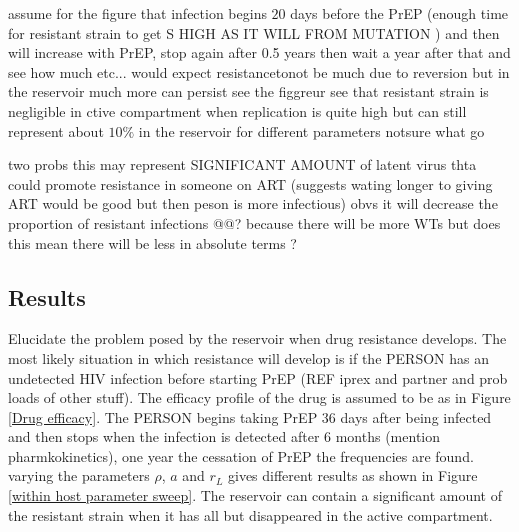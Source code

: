 \documentclass[DIV=15]{scrartcl}
\begin{document}
assume for the figure that infection begins 
$20$ days before the PrEP (enough time for resistant strain to get S HIGH AS IT WILL  FROM MUTATION 	)  and then will  increase with PrEP, stop again  after 0.5  years then wait a year after that and see how much etc...      would expect resistancetonot be much due to  reversion but in the reservoir much more can persist see the figgreur
see that resistant strain is negligible in ctive compartment when replication  is quite high but can still  represent about $10\%$ in the reservoir for different parameters notsure  what go 

two  probs this may represent  SIGNIFICANT AMOUNT 	of latent virus thta could promote resistance in someone on ART (suggests wating longer to giving ART would be good but then peson is  more  infectious) obvs it will  decrease the proportion of resistant infections @@? because there will be more  WTs  but does  this mean there will be less in absolute terms ?



















\subsection{Results}
Elucidate the problem posed by the reservoir when drug resistance develops. The  most likely situation in which resistance will develop is  if  the PERSON has an undetected HIV infection before starting PrEP (REF iprex and partner and prob loads of  other stuff). The efficacy profile of the drug is assumed to be as in Figure \ref{Drug efficacy}. The PERSON begins taking PrEP $36$ days after being infected and then stops when the infection is detected after $6$ months (mention pharmkokinetics), one year the cessation  of PrEP the frequencies are found. varying the parameters $\rho$, $a$ and $r_L$ 
gives different results as shown in Figure \ref{within host parameter sweep}. The reservoir can contain a significant amount of the resistant strain when it has all   but disappeared in the active compartment.
\end{document}
